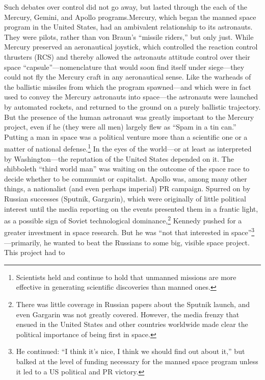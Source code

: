 Such debates over control did not go away, but lasted through the each
of the Mercury, Gemini, and Apollo programs.Mercury, which began the
manned space program in the United States, had an ambivalent
relationship to its astronauts. They were pilots, rather than von
Braun's ``missile riders,'' but only just. While Mercury preserved an
aeronautical joystick, which controlled the reaction control thrusters
(RCS) and thereby allowed the astronauts attitude control over their
space ``capsule''---nomenclature that would soon find itself under
siege\cite{???-DMsclass}---they could not fly the Mercury craft in any
aeronautical sense. Like the warheads of the ballistic missiles from
which the program spawned---and which were in fact used to convey the
Mercury astronauts into space---the astronauts were launched by
automated rockets, and returned to the ground on a purely ballistic
trajectory. But the presence of the human astronaut was greatly
important to the Mercury project, even if he (they were all men)
largely flew as ``Spam in a tin can.''\cite{???} Putting a man in
space was a political venture more than a scientific one or a matter
of national defense.\footnote{Scientists held and continue to hold
  that unmanned missions are more effective in generating scientific
  discoveries than manned ones.} In the eyes of the world---or at
least as interpreted by Washington---the
reputation of the United States depended on it. The shibboleth
``third world man'' was waiting on the outcome of the space race to
decide whether to be communist or capitalist.\cite{???} Apollo was, among many
other things, a nationalist (and even perhaps imperial)  PR campaign.
Spurred on by Russian successes (Sputnik, Gargarin), which were
originally of little political interest until the media reporting on
the events presented them in a frantic light, as a possible sign of
Soviet technological dominance,\footnote{There was little coverage in
  Russian papers about the Sputnik launch, and even Gargarin was not
  greatly covered. However, the media frenzy that ensued in the United
States and other countries worldwide made clear the political
importance of being first in space.\cite{???}} Kennedy pushed for a greater
investment in space research. But he was ``not that interested in
space''\footnote{He continued: ``I think it's nice, I think we should
  find out about it,'' but balked at the level of funding necessary
  for the manned space program unless it led to a US political and PR
  victory.}---primarily, he wanted to beat the Russians to some big,
visible space project.\cite{???-whitehousetapes} This project had to
